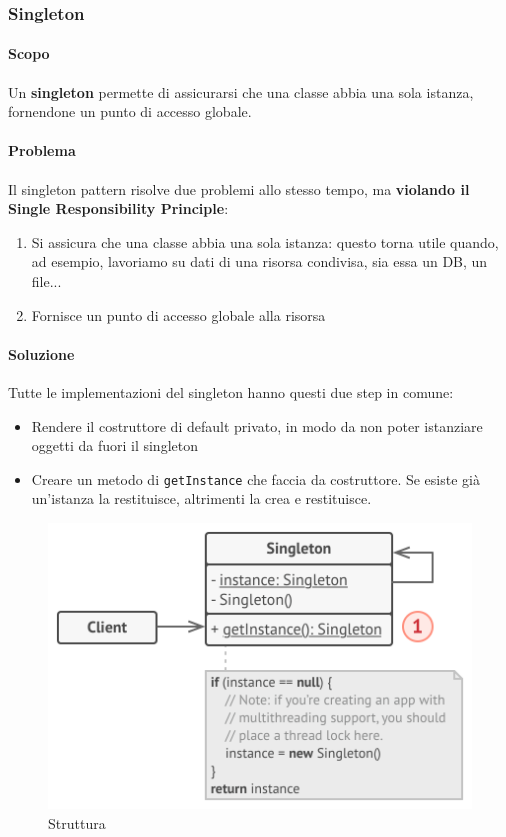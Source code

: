 \documentclass[11pt]{article}
\newcommand{\code}[1]{\texttt{#1}}
\begin{document}
\subsubsection{Singleton}
\paragraph{Scopo}
Un \textbf{singleton} permette di assicurarsi che una classe abbia una sola istanza, fornendone un punto di accesso globale.
\paragraph{Problema}
Il singleton pattern risolve due problemi allo stesso tempo, ma \textbf{violando il Single Responsibility Principle}:
\begin{enumerate}
    \item Si assicura che una classe abbia una sola istanza: questo torna utile quando, ad esempio, lavoriamo su dati di una risorsa condivisa, sia essa un DB, un file...
    \item Fornisce un punto di accesso globale alla risorsa
\end{enumerate}
\paragraph{Soluzione}
Tutte le implementazioni del singleton hanno questi due step in comune:
\begin{itemize}
    \item Rendere il costruttore di default privato, in modo da non poter istanziare oggetti da fuori il singleton 
    \item Creare un metodo di \code{getInstance} che faccia da costruttore. Se esiste già un'istanza la restituisce, altrimenti la crea e restituisce.
\end{itemize}
\begin{figure}[H]
    \centering
    \includegraphics[width=\linewidth]{res/teoria/Singleton.png}
    \caption{Struttura}
\end{figure}
\end{document}
